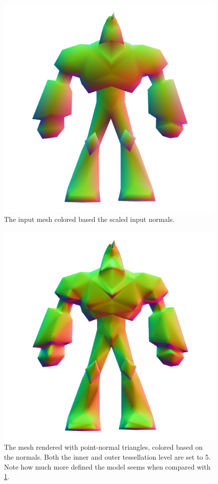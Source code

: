 \documentclass[a4paper,10pt]{article}
\begin{document}
\begin{figure}
	\includegraphics[width=\textwidth]{enforcer_normals.png}
	\caption{The input mesh colored based the scaled input normals.}		
	\label{fig:enforcerNormals}	
\end{figure}

\begin{figure}
	\includegraphics[width=\textwidth]{enforcer_normals_pn_i5_o5.png}
	\caption{The mesh rendered with point-normal triangles, colored based on the normals. Both the inner and outer tessellation level are set to 5. Note how much more defined the model seems when compared with \cref{fig:enforcerNormals}.}
	\label{fig:enforcerNormals5}		
\end{figure}
\end{document}
